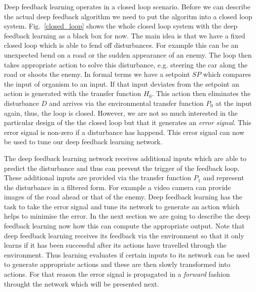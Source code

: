 \documentclass{llncs}
\begin{document}
Deep feedback learning operates in a closed loop scenario. Before we can describe
the actual deep feedback algorithm we need to put the algoritm into a closed loop
system. Fig.~\ref{closed_loop} shows the whole closed loop system with the deep
feedback learning as a black box for now. The main idea is that we have a fixed
closed loop which is able to fend off disturbances. For example this can be
an unexpected bend on a road or the sudden appearance of an enemy. The loop then
takes appropriate action to solve this disturbance, e.g. steering the car along
the road or shoots the enemy. In formal terms we have a setpoint $SP$ which
compares the input of organism to an input. If that input deviates from the
setpoint an action is generated with the transfer function $H_0$. This action
then eliminates the disturbance $D$ and arrives via the environmental
transfer function $P_0$ at the input again, thus, the loop is closed. However,
we are not so much interested in the particular design of the the closed loop
but that it generates an \textsl{error signal}. This error signal is non-zero
if a disturbance has happend. This error signal can now be used to tune our
deep feedback learning network.

The deep feedback learning network receives additional inputs which are able
to predict the disturbance and thus can prevent the trigger of the feedback
loop. These additional inputs are provided via the transfer function $P_1$
and represent the disturbance in a filtered form. For example a video camera
can provide images of the road ahead or that of the enemy. Deep feedback
learning has the task to take the error signal and tune its network
to generate an action which helps to minimise the error. In the next section
we are going to describe the deep feedback learning now how this can
compute the appropriate output. Note that deep feedback learning receives
its feedback via the environment so that it only learns if it has been
successful after its actions have travelled through the environment. Thus learning
evaluates if certain inputs to its network can be used to generate
appropriate actions and these are then slowly transformed into actions.
For that reason the error signal is propagated in a \textsl{forward} fashion
throught the network which will be presented next.
\end{document}

